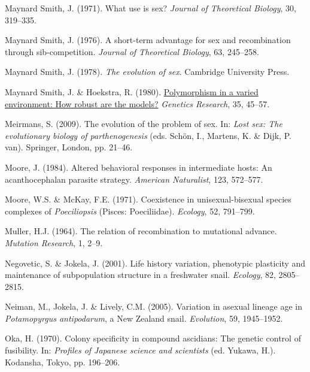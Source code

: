 \documentclass[
  letterpaper,
]{book}
\newlength{\cslhangindent}
\newenvironment{CSLReferences}[2] %
 {\begin{list}{}{%
  \setlength{\itemindent}{0pt}
  \setlength{\leftmargin}{0pt}
  \setlength{\parsep}{0pt}
  \ifodd #1
   \setlength{\leftmargin}{\cslhangindent}
   \setlength{\itemindent}{-1\cslhangindent}
  \fi
  \setlength{\itemsep}{#2\baselineskip}}}
 {\end{list}}
\begin{document}
\begin{CSLReferences}{1}{0}
Maynard Smith, J. (1971). What use is sex? \emph{Journal of Theoretical
Biology}, 30, 319--335.

Maynard Smith, J. (1976). A short-term advantage for sex and
recombination through sib-competition. \emph{Journal of Theoretical
Biology}, 63, 245--258.

Maynard Smith, J. (1978). \emph{The evolution of sex}. Cambridge
University Press.

Maynard Smith, J. \& Hoekstra, R. (1980).
\href{https://doi.org/10.1017/S0016672300013926}{Polymorphism in a
varied environment: How robust are the models?} \emph{Genetics
Research}, 35, 45--57.

Meirmans, S. (2009). The evolution of the problem of sex. In: \emph{Lost
sex: The evolutionary biology of parthenogenesis} (eds. Schön, I.,
Martens, K. \& Dijk, P. van). Springer, London, pp. 21--46.

Moore, J. (1984). Altered behavioral responses in intermediate hosts: An
acanthocephalan parasite strategy. \emph{American Naturalist}, 123,
572--577.

Moore, W.S. \& McKay, F.E. (1971). Coexistence in unisexual-bisexual
species complexes of \emph{{P}oeciliopsis} ({Pisces: Poeciliidae}).
\emph{Ecology}, 52, 791--799.

Muller, H.J. (1964). The relation of recombination to mutational
advance. \emph{Mutation Research}, 1, 2--9.

Negovetic, S. \& Jokela, J. (2001). Life history variation, phenotypic
plasticity and maintenance of subpopulation structure in a freshwater
snail. \emph{Ecology}, 82, 2805--2815.

Neiman, M., Jokela, J. \& Lively, C.M. (2005). Variation in asexual
lineage age in \emph{{P}otamopyrgus antipodarum}, a {New Zealand} snail.
\emph{Evolution}, 59, 1945--1952.

Oka, H. (1970). Colony specificity in compound ascidians: The genetic
control of fusibility. In: \emph{Profiles of {Japanese} science and
scientists} (ed. Yukawa, H.). Kodansha, Tokyo, pp. 196--206.


\end{CSLReferences}
\end{document}
